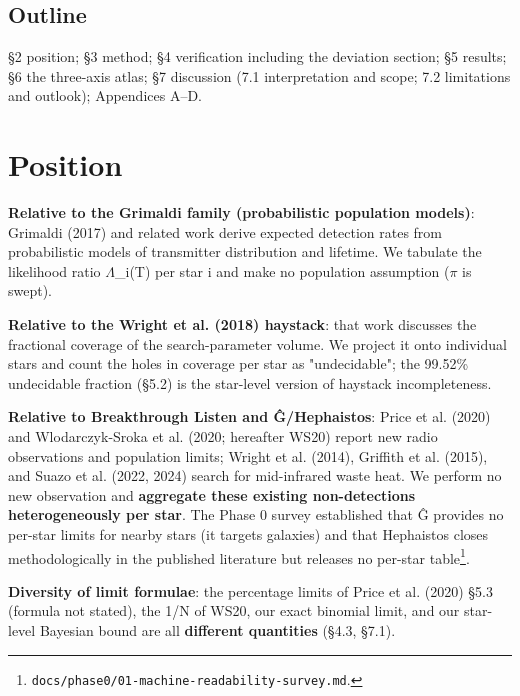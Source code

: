 \documentclass{aa}
\begin{document}
\subsection{Outline}
\noindent \S{}2 position; \S{}3 method; \S{}4 verification including the deviation section; \S{}5 results; \S{}6 the three-axis atlas; \S{}7 discussion (7.1 interpretation and scope; 7.2 limitations and outlook); Appendices A--D.\par\smallskip

\section{Position}

\noindent \textbf{Relative to the Grimaldi family (probabilistic population models)}: Grimaldi (2017) and related work derive expected detection rates from probabilistic models of transmitter distribution and lifetime. We tabulate the likelihood ratio \(\Lambda\)\_i(T) per star i and make no population assumption (\(\pi\) is swept).\par\smallskip
\noindent \textbf{Relative to the Wright et al. (2018) haystack}: that work discusses the fractional coverage of the search-parameter volume. We project it onto individual stars and count the holes in coverage per star as "undecidable"; the 99.52\% undecidable fraction (\S{}5.2) is the star-level version of haystack incompleteness.\par\smallskip
\noindent \textbf{Relative to Breakthrough Listen and \^{G}/Hephaistos}: Price et al. (2020) and Wlodarczyk-Sroka et al. (2020; hereafter WS20) report new radio observations and population limits; Wright et al. (2014), Griffith et al. (2015), and Suazo et al. (2022, 2024) search for mid-infrared waste heat. We perform no new observation and \textbf{aggregate these existing non-detections heterogeneously per star}. The Phase 0 survey established that \^{G} provides no per-star limits for nearby stars (it targets galaxies) and that Hephaistos closes methodologically in the published literature but releases no per-star table\footnote{\texttt{docs/phase0/01-machine-readability-survey.md}.}.\par\smallskip
\noindent \textbf{Diversity of limit formulae}: the percentage limits of Price et al. (2020) \S{}5.3 (formula not stated), the 1/N of WS20, our exact binomial limit, and our star-level Bayesian bound are all \textbf{different quantities} (\S{}4.3, \S{}7.1).\par\smallskip
\end{document}
